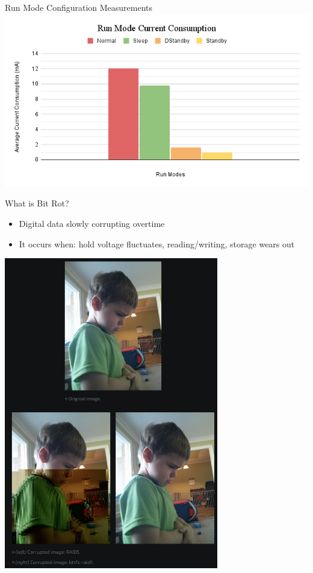\begin{frame}{Run Mode Configuration Measurements}
    \centering
    \includegraphics[height=0.8\textheight,width=1.0\textwidth,keepaspectratio]{images/run_modes.png}
\end{frame}

\begin{frame}{What is Bit Rot?}
    \begin{itemize}
        \item Digital data slowly corrupting overtime
        \item It occurs when: hold voltage fluctuates, reading/writing, storage wears out
    \end{itemize}
    \centering
    \includegraphics[height=0.7\textheight,width=0.7\textwidth,keepaspectratio]{images/bit_flip.png}
\end{frame}

